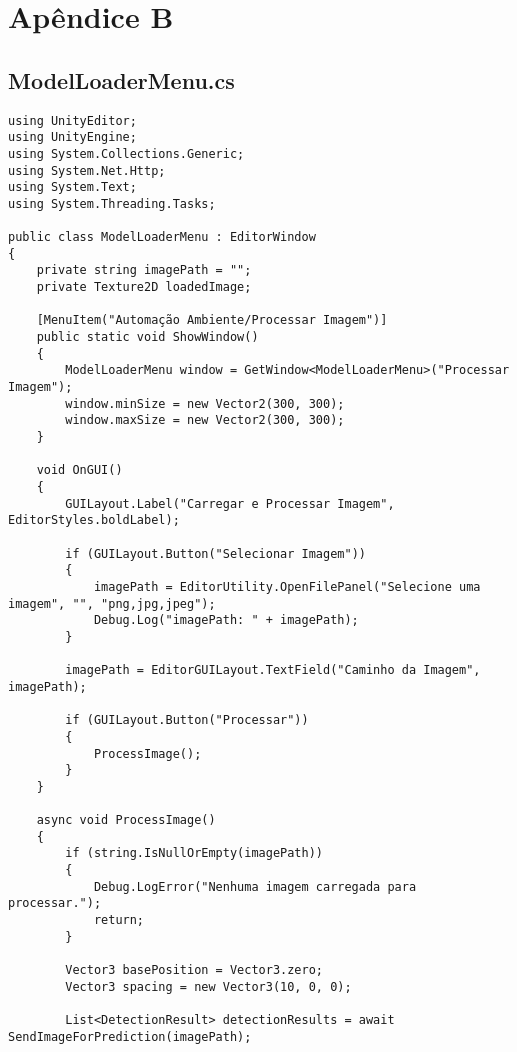 
\chapter{Apêndice B}
\label{chap:ModelLoaderMenu}

\section{ModelLoaderMenu.cs}


\begin{lstlisting}
using UnityEditor;
using UnityEngine;
using System.Collections.Generic;
using System.Net.Http;
using System.Text;
using System.Threading.Tasks;

public class ModelLoaderMenu : EditorWindow
{
    private string imagePath = "";
    private Texture2D loadedImage;

    [MenuItem("Automação Ambiente/Processar Imagem")]
    public static void ShowWindow()
    {
        ModelLoaderMenu window = GetWindow<ModelLoaderMenu>("Processar Imagem");
        window.minSize = new Vector2(300, 300);
        window.maxSize = new Vector2(300, 300);
    }

    void OnGUI()
    {
        GUILayout.Label("Carregar e Processar Imagem", EditorStyles.boldLabel);

        if (GUILayout.Button("Selecionar Imagem"))
        {
            imagePath = EditorUtility.OpenFilePanel("Selecione uma imagem", "", "png,jpg,jpeg");
            Debug.Log("imagePath: " + imagePath);
        }

        imagePath = EditorGUILayout.TextField("Caminho da Imagem", imagePath);

        if (GUILayout.Button("Processar"))
        {
            ProcessImage();
        }
    }   

    async void ProcessImage()
    {
        if (string.IsNullOrEmpty(imagePath))
        {
            Debug.LogError("Nenhuma imagem carregada para processar.");
            return;
        }

        Vector3 basePosition = Vector3.zero;
        Vector3 spacing = new Vector3(10, 0, 0); 

        List<DetectionResult> detectionResults = await SendImageForPrediction(imagePath);


\end{lstlisting}
